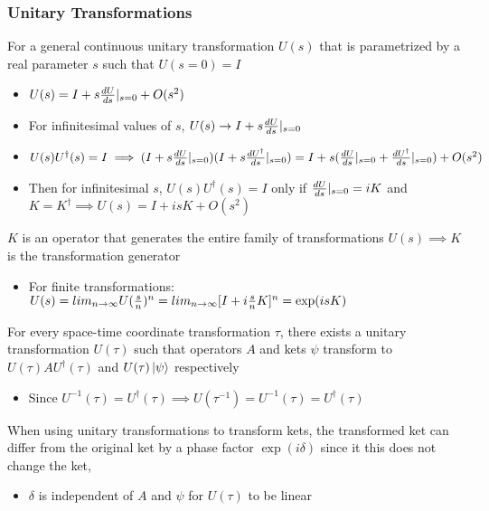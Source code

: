 \documentclass[8pt,t,mathserif,aspectratio=169]{beamer}
\begin{document}
\begin{frame}
  \frametitle{Unitary Transformations}
  \vspace{1mm}
  For a general continuous unitary transformation $U(s)$ that is parametrized by a real parameter $s$ such that $U(s = 0) = I$
  \begin{itemize}
    \item $U(s) = I + s {dU \over ds}|_{s = 0} + O(s^2)$
    \item For infinitesimal values of $s$, $U(s) \to I + s {dU \over ds}|_{s = 0}$
    \item $U(s) U^{\dagger}(s) = I \implies (I + s {dU \over ds}|_{s = 0})(I + s {dU^{\dagger} \over ds}|_{s = 0}) = I + s ({dU \over ds}|_{s = 0} +  {dU^{\dagger} \over ds}|_{s = 0}) + O(s^2)$
    \item Then for infinitesimal $s$, $U(s) U^{\dagger}(s) = I$ only if ${dU \over ds}|_{s = 0} = iK$ and $K = K^{\dagger} \implies U(s) = I + i s K + O(s^2)$
  \end{itemize}
  $K$ is an operator that generates the entire family of transformations $U(s) \implies K$ is the transformation generator
  \begin{itemize}
    \item For finite transformations: $U(s) = lim_{n \to \infty} U({s \over n})^n = lim_{n \to \infty} [I + i {s \over n} K]^n = \exp(isK)$
  \end{itemize}
  For every space-time coordinate transformation $\tau$, there exists a unitary transformation $U(\tau)$ such that operators $A$ and kets $\psi$ transform to $U(\tau) A U^{\dagger}(\tau)$ and $U(\tau) \ket{\psi}$ respectively
  \begin{itemize}
    \item Since $U^{-1}(\tau) = U^{\dagger}(\tau) \implies U(\tau^{-1}) = U^{-1}(\tau) = U^{\dagger}(\tau)$
  \end{itemize}
  When using unitary transformations to transform kets, the transformed ket can differ from the original ket by a phase factor $\exp(i \delta)$ since it this does not change the ket, 
  \begin{itemize}
    \item $\delta$ is independent of $A$ and $\psi$ for $U(\tau)$ to be linear
  \end{itemize}
\end{frame}
\end{document}
